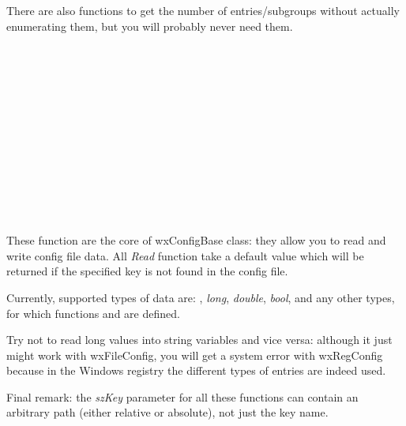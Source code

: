 There are also functions to get the number of entries/subgroups without
actually enumerating them, but you will probably never need them.

\\
\\
\\
\\
\\


\label{configtestsofexistence}

\\
\\
\\


\label{configmiscellaneous}

\\
\\


\label{configkeyaccess}

These function are the core of wxConfigBase class: they allow you to read and
write config file data. All {\it Read} function take a default value which
will be returned if the specified key is not found in the config file.

Currently, supported types of data are:
, {\it long}, {\it double}, {\it bool},
 and any other types,
for which functions 
and  are defined.

Try not to read long values into string variables and vice versa: although it
just might work with wxFileConfig, you will get a system error with
wxRegConfig because in the Windows registry the different types of entries are
indeed used.

Final remark: the {\it szKey} parameter for all these functions can contain an
arbitrary path (either relative or absolute), not just the key name.

